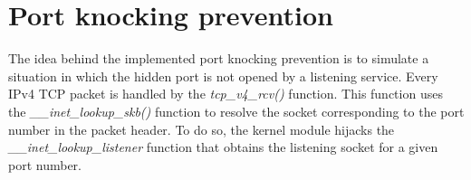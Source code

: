\section{Port knocking prevention}
The idea behind the implemented port knocking prevention is to simulate a 
situation in which the hidden port is not opened by a listening service.
Every IPv4 TCP packet is handled by the \textit{tcp_v4_rcv()} function. This 
function uses the \textit{__inet_lookup_skb()} function to resolve the socket 
corresponding to the port number in the packet header. 
To do so, the kernel module hijacks the \textit{__inet_lookup_listener} 
function that obtains the listening socket for a given port number.